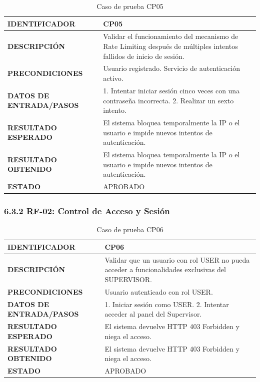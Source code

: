 \begin{table}[H]
\centering
\caption{Caso de prueba CP05}
\begin{tabular}{|p{3.5cm}|p{10.3cm}|}
\hline
\textbf{IDENTIFICADOR} & CP05 \\
\hline
\textbf{DESCRIPCIÓN} & Validar el funcionamiento del mecanismo de Rate Limiting después de múltiples intentos fallidos de inicio de sesión. \\
\hline
\textbf{PRECONDICIONES} & Usuario registrado. Servicio de autenticación activo. \\
\hline
\textbf{DATOS DE ENTRADA/PASOS} & 1. Intentar iniciar sesión cinco veces con una contraseña incorrecta. 2. Realizar un sexto intento. \\
\hline
\textbf{RESULTADO ESPERADO} & El sistema bloquea temporalmente la IP o el usuario e impide nuevos intentos de autenticación. \\
\hline
\textbf{RESULTADO OBTENIDO} & El sistema bloquea temporalmente la IP o el usuario e impide nuevos intentos de autenticación. \\
\hline
\textbf{ESTADO} & APROBADO \\
\hline
\end{tabular}
\end{table}

\subsubsection{6.3.2 RF-02: Control de Acceso y Sesión}

\begin{table}[H]
\centering
\caption{Caso de prueba CP06}
\begin{tabular}{|p{3.5cm}|p{10.3cm}|}
\hline
\textbf{IDENTIFICADOR} & CP06 \\
\hline
\textbf{DESCRIPCIÓN} & Validar que un usuario con rol USER no pueda acceder a funcionalidades exclusivas del SUPERVISOR. \\
\hline
\textbf{PRECONDICIONES} & Usuario autenticado con rol USER. \\
\hline
\textbf{DATOS DE ENTRADA/PASOS} & 1. Iniciar sesión como USER. 2. Intentar acceder al panel del Supervisor. \\
\hline
\textbf{RESULTADO ESPERADO} & El sistema devuelve HTTP 403 Forbidden y niega el acceso. \\
\hline
\textbf{RESULTADO OBTENIDO} & El sistema devuelve HTTP 403 Forbidden y niega el acceso. \\
\hline
\textbf{ESTADO} & APROBADO \\
\hline
\end{tabular}
\end{table}

